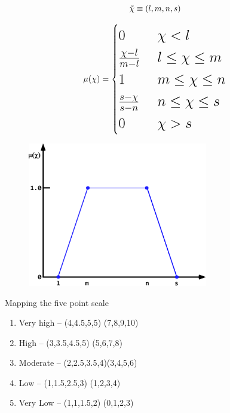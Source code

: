 \documentclass[aspectratio=1610,pdftex,dvipsnames,compress,xcolor={dvipsnames}]{beamer}
\begin{document}
\begin{frame}{}
    \begin{equation}
        \LARGE
         \tilde{\chi} \equiv (l,m,n,s)
    \end{equation}

    \begin{equation}
        \LARGE
        \mu(\chi)=
    \begin{cases}
        0 & \; \chi < l \\
        \frac{\chi-l}{m-l} & \; l \leq \chi \leq m \\
        1 & \; m \leq \chi \leq n \\
        \frac{s-\chi}{s-n} & \; n \leq \chi \leq s \\
        0 & \; \chi > s
    \end{cases}
    \end{equation}
\end{frame}


\begin{frame}{}
    \begin{figure}
        \centering
        \includegraphics[width=0.70\textwidth]{fuzzy-ahp-membership.png}
    \end{figure}
\end{frame}


\begin{frame}{Mapping the five point scale}
    \begin{enumerate}[series=outerlist,topsep=0pt,itemsep=15pt,leftmargin=*,label=(\arabic*)]
        \item[]Very high -- (4,4.5,5,5) (7,8,9,10)
        \item[]High -- (3,3.5,4.5,5)    (5,6,7,8)
        \item[]Moderate -- (2,2.5,3.5,4)(3,4,5,6) 
        \item[]Low -- (1,1.5,2.5,3)     (1,2,3,4) 
        \item[]Very Low -- (1,1,1.5,2)  (0,1,2,3)
    \end{enumerate}
\end{frame}
\end{document}
